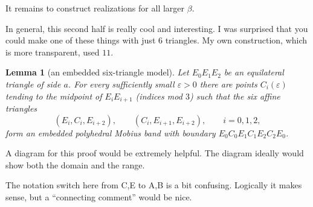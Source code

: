 \documentclass[12pt]{article}
\newtheorem{lemma}{Lemma}
\newcommand{\review}[1]{\begin{reviewbox}#1\end{reviewbox}}
\begin{document}
It remains to construct realizations for all larger \(\beta\).


\review{In general, this second half is really cool and interesting.  I was surprised that you could make one of these things with just $6$ triangles. My own construction, which is more transparent, used $11$.}


\begin{lemma}[an embedded six-triangle model]\label{lem:model}
Let \(E_0E_1E_2\) be an equilateral triangle of side \(a\).  For every
sufficiently small \(\varepsilon>0\) there are points \(C_i(\varepsilon)\)
tending to the midpoint of \(E_iE_{i+1}\) (indices mod \(3\)) such that
the six affine triangles
\[
(E_i,C_i,E_{i+2}),\qquad (C_i,E_{i+1},E_{i+2}),\qquad i=0,1,2,
\]
form an embedded polyhedral Mobius band with boundary
\(E_0C_0E_1C_1E_2C_2E_0\).
\end{lemma}


\review{A diagram for this proof would be extremely helpful.  The diagram ideally would show both the domain and the range.}


\review{The notation switch here from C,E to A,B is a bit confusing.  Logically it makes sense, but a ``connecting comment'' would be nice.}
\end{document}
